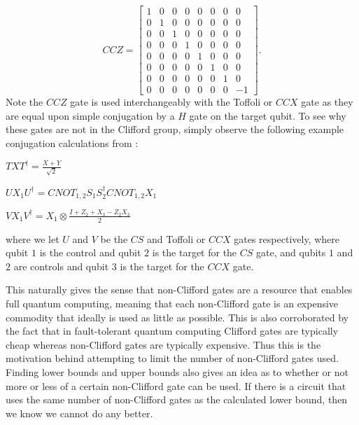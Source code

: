 \documentclass[12pt]{dalthesis}
\begin{document}
\begin{equation*}
CCZ = 
\begin{bmatrix}
1 & 0 & 0 & 0 & 0 & 0 & 0 & 0 \\
0 & 1 & 0 & 0 & 0 & 0 & 0 & 0 \\
0 & 0 & 1 & 0 & 0 & 0 & 0 & 0 \\
0 & 0 & 0 & 1 & 0 & 0 & 0 & 0 \\
0 & 0 & 0 & 0 & 1 & 0 & 0 & 0 \\
0 & 0 & 0 & 0 & 0 & 1 & 0 & 0 \\
0 & 0 & 0 & 0 & 0 & 0 & 1 & 0 \\
0 & 0 & 0 & 0 & 0 & 0 & 0 & -1 
\end{bmatrix}.
\end{equation*}
Note the $CCZ$ gate is used interchangeably with the Toffoli or $CCX$ gate as they are equal upon simple conjugation by a $H$ gate on the target qubit. To see why these gates are not in the Clifford group, simply observe the following example conjugation calculations from \cite{beverland2019lower}:
\begin{center}
$TXT^{\dag} = \frac{X+Y}{\sqrt{2}}$
\end{center}
\begin{center}
$UX_1U^{\dag} = CNOT_{1,2}S_1S_2^{\dag}CNOT_{1, 2}X_1$
\end{center}
\begin{center}
$VX_1V^{\dag} = X_1 \otimes \frac{I + Z_2 +X_3 -Z_2X_3}{2}$
\end{center}
where we let $U$ and $V$ be the $CS$ and Toffoli or $CCX$ gates respectively, where qubit $1$ is the control and qubit $2$ is the target for the $CS$ gate, and qubits $1$ and $2$ are controls and qubit $3$ is the target for the $CCX$ gate. 

This naturally gives the sense that non-Clifford gates are a resource that enables full quantum computing, meaning that each non-Clifford gate is an expensive commodity that ideally is used as little as possible. This is also corroborated by the fact that in fault-tolerant quantum computing Clifford gates are typically cheap whereas non-Clifford gates are typically expensive. Thus this is the motivation behind attempting to limit the number of non-Clifford gates used. Finding lower bounds and upper bounds also gives an idea as to whether or not more or less of a certain non-Clifford gate can be used. If there is a circuit that uses the same number of non-Clifford gates as the calculated lower bound, then we know we cannot do any better.
\end{document}
